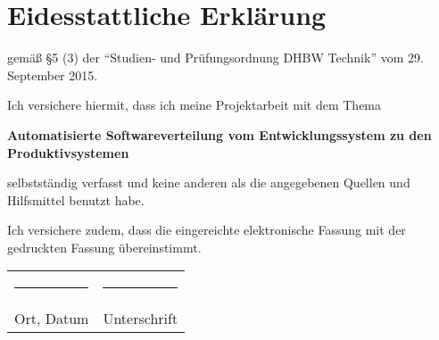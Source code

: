 %
\chapter*{Eidesstattliche Erklärung}
\thispagestyle{empty}
\begin{center}
gemäß \S 5 (3) der "`Studien- und Prüfungsordnung DHBW Technik"' vom 29. September 2015.
\vspace{\baselineskip}

Ich versichere hiermit, dass ich meine Projektarbeit mit dem Thema
\vspace{\baselineskip}

\textbf{Automatisierte Softwareverteilung vom Entwicklungssystem zu den Produktivsystemen}

\vspace{\baselineskip}

selbstständig verfasst und keine anderen als die angegebenen Quellen und Hilfsmittel benutzt habe.
\vspace{\baselineskip}

Ich versichere zudem, dass die eingereichte elektronische Fassung mit der gedruckten Fassung übereinstimmt.

\vspace{3cm}

\begin{tabular}{p{7.5cm}p{7.5cm}}
\rule{6cm}{0.4pt} & \rule{6cm}{0.4pt}\\
Ort, Datum & Unterschrift\\

\end{tabular}
\end{center}
%
